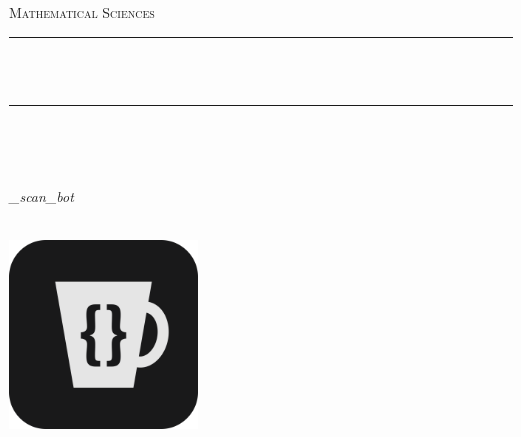 \documentclass[10pt]{report}
\title{\VAR{title}}
\author{\VAR{author}}
\date{\VAR{date}}
\makeatletter
\let\thetitle\@title
\makeatother
\begin{document}
	\begin{titlepage}
		\centering
		\vspace*{0.5 cm}
		\begin{center}
			\textsc{\Large   Mathematical Sciences}\\[2.0 cm]
		\end{center}%
		\rule{\linewidth}{0.2 mm} \\[0.4 cm]
		{ \huge \bfseries \thetitle}\\
		\rule{\linewidth}{0.2 mm} \\[1.5 cm]

		\begin{minipage}{0.4\textwidth}
			\begin{flushleft}
				\large
			\end{flushleft}
		\end{minipage}~

		\begin{minipage}{0.4\textwidth}

			\begin{flushright}
				\large
				\emph{\@procamora\_scan\_bot}
			\end{flushright}
		\end{minipage}\\[2 cm]

		\includegraphics[width=5cm]{icons/profile.png}
	\end{titlepage}





\end{document}
